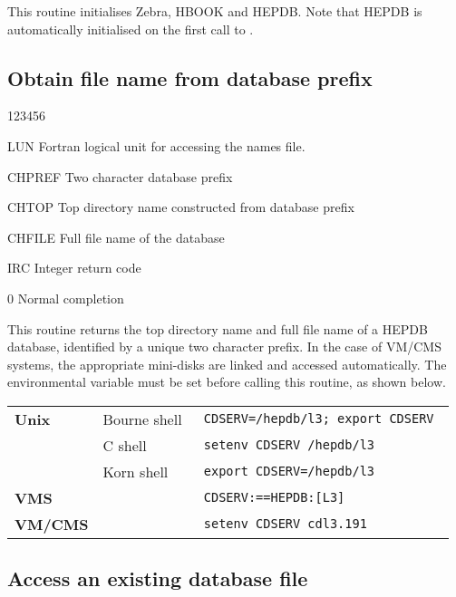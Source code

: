 This routine initialises Zebra, HBOOK and HEPDB. Note that HEPDB
is automatically initialised on the first call to .

\subsection{Obtain file name from database prefix}


\begin{DLtt}{123456}
\item[LUN]Fortran logical unit for accessing the names file.
\item[CHPREF]Two character database prefix
\item[CHTOP]Top directory name constructed from database prefix
\item[CHFILE]Full file name of the database
\item[IRC]Integer return code
  \begin{DLtt}{1}
    \item[0]Normal completion
  \end{DLtt}
\end{DLtt}

This routine returns the top directory name and full file name of
a HEPDB database, identified by a unique two character prefix.
In the case of VM/CMS systems, the appropriate mini-disks
are linked and accessed automatically.
The environmental variable  must be set before calling
this routine, as shown below.

\medskip

\begin{tabular}{@{}l@{\quad}l@{\quad}>{\tt}l}
\bf Unix     & Bourne shell & CDSERV=/hepdb/l3; export CDSERV   \\
             & C shell      & setenv CDSERV /hepdb/l3           \\
             & Korn shell   & export CDSERV=/hepdb/l3           \\[2mm]
\bf VMS      &              & CDSERV:==HEPDB:[L3]               \\[2mm]
\bf VM/CMS   &              & setenv CDSERV cdl3.191            \\
\end{tabular}

\subsection{Access an existing database file}

